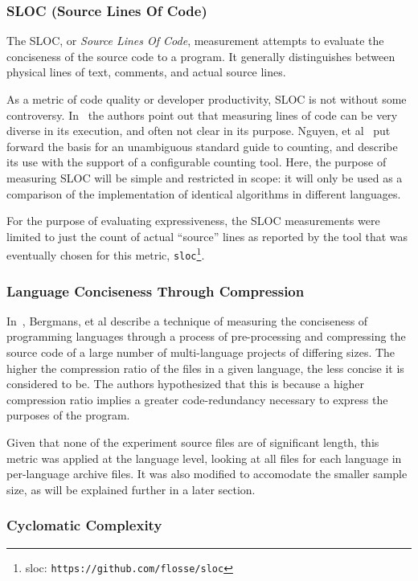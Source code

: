 \subsubsection{SLOC (Source Lines Of Code)}

The SLOC, or \textit{Source Lines Of Code}, measurement attempts to evaluate the conciseness of the source code to a program. It generally distinguishes between physical lines of text, comments, and actual source lines.

As a metric of code quality or developer productivity, SLOC is not without some controversy. In~\cite{alpernas} the authors point out that measuring lines of code can be very diverse in its execution, and often not clear in its purpose. Nguyen, et al~\cite{nguyen} put forward the basis for an unambiguous standard guide to counting, and describe its use with the support of a configurable counting tool. Here, the purpose of measuring SLOC will be simple and restricted in scope: it will only be used as a comparison of the implementation of identical algorithms in different languages.

For the purpose of evaluating expressiveness, the SLOC measurements were limited to just the count of actual ``source'' lines as reported by the tool that was eventually chosen for this metric, \texttt{sloc}\footnote{sloc: \texttt{https://github.com/flosse/sloc}}.

\subsubsection{Language Conciseness Through Compression}

In~\cite{bergmans}, Bergmans, et al describe a technique of measuring the conciseness of programming languages through a process of pre-processing and compressing the source code of a large number of multi-language projects of differing sizes. The higher the compression ratio of the files in a given language, the less concise it is considered to be. The authors hypothesized that this is because a higher compression ratio implies a greater code-redundancy necessary to express the purposes of the program.

Given that none of the experiment source files are of significant length, this metric was applied at the language level, looking at all files for each language in per-language archive files. It was also modified to accomodate the smaller sample size, as will be explained further in a later section.

\subsubsection{Cyclomatic Complexity}

